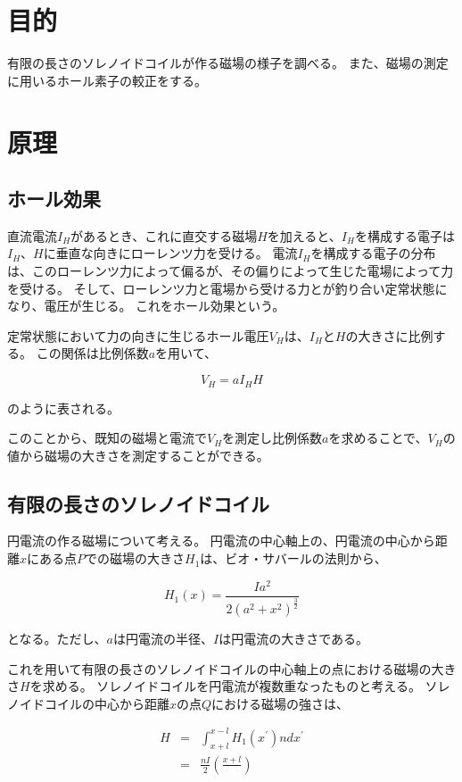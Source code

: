 \documentclass[uplatex,11pt]{jsarticle}
\begin{document}
\section{目的}

有限の長さのソレノイドコイルが作る磁場の様子を調べる。
また、磁場の測定に用いるホール素子の較正をする。

\section{原理}

\subsection{ホール効果}

直流電流$I_H$があるとき、これに直交する磁場$H$を加えると、$I_H$を構成する電子は$I_H$、$H$に垂直な向きにローレンツ力を受ける。
電流$I_H$を構成する電子の分布は、このローレンツ力によって偏るが、その偏りによって生じた電場によって力を受ける。
そして、ローレンツ力と電場から受ける力とが釣り合い定常状態になり、電圧が生じる。
これをホール効果という。

定常状態において力の向きに生じるホール電圧$V_H$は、$I_H$と$H$の大きさに比例する。
この関係は比例係数$a$を用いて、

\[
    V_H = a I_H H
\]

のように表される。

このことから、既知の磁場と電流で$V_H$を測定し比例係数$a$を求めることで、$V_H$の値から磁場の大きさを測定することができる。

\subsection{有限の長さのソレノイドコイル}

円電流の作る磁場について考える。
円電流の中心軸上の、円電流の中心から距離$x$にある点$P$での磁場の大きさ$H_1$は、ビオ・サバールの法則から、

\[
    H_1(x) = \frac{Ia^2}{2(a^2+x^2)^\frac{3}{2}}
\]

となる。ただし、$a$は円電流の半径、$I$は円電流の大きさである。

これを用いて有限の長さのソレノイドコイルの中心軸上の点における磁場の大きさ$H$を求める。
ソレノイドコイルを円電流が複数重なったものと考える。
ソレノイドコイルの中心から距離$x$の点$Q$における磁場の強さは、

\begin{eqnarray}
    H & = & \int_{x + l}^{x - l} H_1(x^{\prime}) ndx^{\prime} \\
      & = & \frac{nI}{2} \left( \frac{x + l}{} \right)
\end{eqnarray}
\end{document}
